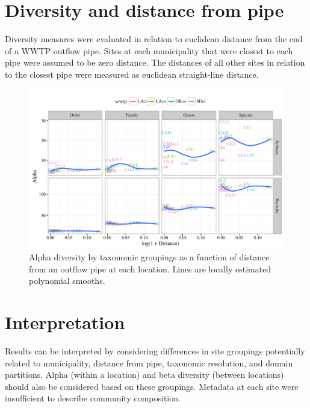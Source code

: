 \documentclass[letterpaper,12pt]{article}\usepackage[]{graphicx}\usepackage[]{color}
\makeatletter
\def\maxwidth{ %
  \ifdim\Gin@nat@width>\linewidth
    \linewidth
  \else
    \Gin@nat@width
  \fi
}
\newenvironment{knitrout}{}{} %
\makeatother
\begin{document}
\clearpage





\section{Diversity and distance from pipe}

Diversity measures were evaluated in relation to euclidean distance from the end of a WWTP outflow pipe.  Sites at each municipality that were closest to each pipe were assumed to be zero distance.  The distances of all other sites in relation to the closest pipe were measured as euclidean straight-line distance.
\begin{knitrout}
\color{fgcolor}\begin{figure}[!ht]

{\centering \includegraphics[width=\maxwidth]{figs/alphdist-1} 

}

\caption[Alpha diversity by taxonomic groupings as a function of distance from an outflow pipe at each location]{Alpha diversity by taxonomic groupings as a function of distance from an outflow pipe at each location.  Lines are locally estimated polynomial smooths.}\label{fig:alphdist}
\end{figure}


\end{knitrout}

\section{Interpretation}

Results can be interpreted by considering differences in site groupings potentially related to municipality, distance from pipe, taxonomic resolution, and domain partitions.  Alpha (within a location) and beta diversity (between locations) should also be considered based on these groupings.  Metadata at each site were insufficient to describe community composition.   
\end{document}
